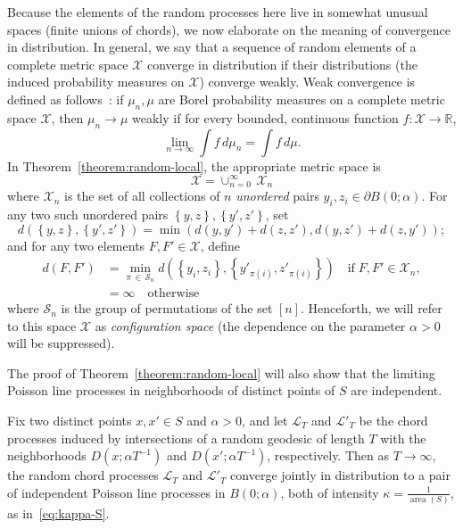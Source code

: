 \documentclass[AHL, Unicode, longabstracts, published]{cedram}
\newcommand{\xset}[1]{\left\{ #1 \right\}}
\newcommand{\zz}[1]{\mathbb #1}
\DeclareMathOperator{\area}{area}
\begin{document}
Because the elements of the random processes here live in somewhat unusual spaces (finite unions of chords), we now elaborate on the meaning of convergence in distribution. In general, we say that a sequence of random elements of a complete metric space $\mathcal{X}$ converge in distribution if their distributions (the induced probability measures on $\mathcal{X}$) converge weakly. Weak convergence is defined as follows~\cite{billingsley}: if $\mu_{n},\mu$ are Borel probability measures on a complete metric space $\mathcal{X}$, then $\mu_{n}\rightarrow \mu$ weakly if for every bounded, continuous function $f:\mathcal{X}\rightarrow \zz{R}$,
\begin{equation}\label{eq:weak-conv-definition}
\lim_{n \rightarrow\infty}\int f\, d\mu_{n} =\int f \,d\mu.
\end{equation}
In Theorem~\ref{theorem:random-local}, the appropriate metric space is
\[
\mathcal{X}=\cup_{n=0}^{\infty}\,\mathcal{X}_{n}
\]
where $\mathcal{X}_{n}$ is the set of all collections of $n$ \emph{unordered} pairs $y_{i}, z_{i}\in \partial B (0;\alpha)$. For any two such unordered pairs $\xset {y,z}, \xset {y',z'}$, set
\[
d\left(\xset {y,z}, \xset {y',z'}\right)=\min (d(y,y')+d(z,z'),d(y,z')+d(z,y'));
\]
and for any two elements $F,F'\in \mathcal{X}$, define
\begin{align*}
d(F,F')&= \min _{\pi\,\in\,\mathcal{S}_{n}} d\left (\xset {y_{i},z_{i}},\xset {y'_{ \pi (i)},z'_{\pi (i)}}\right) \quad
\text{if} \; F,F' \in \mathcal{X}_{n}, \\
&= \infty \quad \text{otherwise}
\end{align*}
where $\mathcal{S}_{n}$ is the group of permutations of the set $[n]$. Henceforth, we will refer to this space $\mathcal{X}$ as \emph{configuration space} (the dependence on the parameter $\alpha >0$ will be suppressed).

The proof of Theorem~\ref{theorem:random-local} will also show that the limiting Poisson line processes in neighborhoods of distinct points of $S$ are independent.

\begin{theo}\label{theorem:random-local-pairs}
Fix two distinct points $x,x'\in S$ and $\alpha >0$, and let $\mathcal{L}_{T}$ and $\mathcal{L}'_{T}$ be the chord processes induced by intersections of a random geodesic of length $T$ with the neighborhoods $D(x;\alpha T^{-1})$ and $D(x';\alpha T^{-1})$, respectively. Then as $T \rightarrow \infty$, the random chord processes $\mathcal{L}_{T}$ and $\mathcal{L}'_{T}$ converge jointly in distribution to a pair of independent Poisson line processes in $B (0;\alpha)$, both of intensity $\kappa = \frac{1}{\area(S)}$, as in~\eqref{eq:kappa-S}.
\end{theo}
\end{document}
